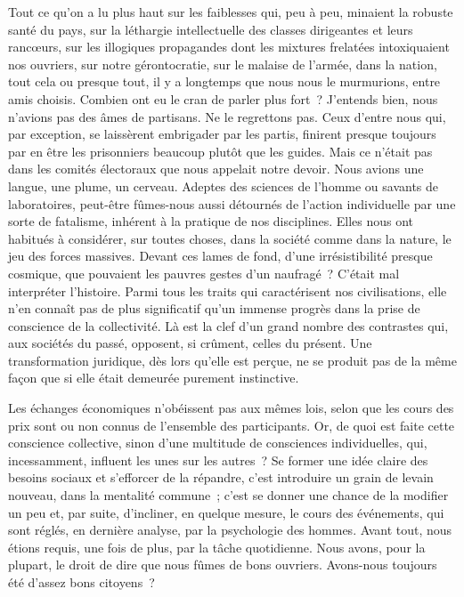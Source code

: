 \documentclass[french,twoside]{book} %
\begin{document}
Tout ce qu’on a lu plus haut sur les faiblesses qui, peu à peu, minaient la robuste santé du pays, sur la léthargie intellectuelle des classes dirigeantes et leurs rancœurs, sur les illogiques propagandes dont les mixtures frelatées intoxiquaient nos ouvriers, sur notre gérontocratie, sur le malaise de l’armée, dans la nation, tout cela ou presque tout, il y a longtemps que nous nous le murmurions, entre amis choisis. Combien ont eu le cran de parler plus fort ? J’entends bien, nous n’avions pas des âmes de partisans. Ne le regrettons pas. Ceux d’entre nous qui, par exception, se laissèrent embrigader par les partis, finirent presque toujours par en être les prisonniers beaucoup plutôt que les guides. Mais ce n’était pas dans les comités électoraux que nous appelait notre devoir. Nous avions une langue, une plume, un cerveau. Adeptes des sciences de l’homme ou savants de   laboratoires, peut-être fûmes-nous aussi détournés de l’action individuelle par une sorte de fatalisme, inhérent à la pratique de nos disciplines. Elles nous ont habitués à considérer, sur toutes choses, dans la société comme dans la nature, le jeu des forces massives. Devant ces lames de fond, d’une irrésistibilité presque cosmique, que pouvaient les pauvres gestes d’un naufragé ? C’était mal interpréter l’histoire. Parmi tous les traits qui caractérisent nos civilisations, elle n’en connaît pas de plus significatif qu’un immense progrès dans la prise de conscience de la collectivité. Là est la clef d’un grand nombre des contrastes qui, aux sociétés du passé, opposent, si crûment, celles du présent. Une transformation juridique, dès lors qu’elle est perçue, ne se produit pas de la même façon que si elle était demeurée purement instinctive.\par
Les échanges économiques n’obéissent pas aux mêmes lois, selon que les cours des prix sont ou non connus de l’ensemble des participants. Or, de quoi est faite cette conscience collective, sinon d’une multitude de consciences individuelles, qui, incessamment, influent les unes sur les autres ? Se former une idée claire des besoins sociaux et s’efforcer de la répandre, c’est introduire un grain de levain nouveau, dans la mentalité commune ; c’est se donner une chance de la modifier un peu et, par suite, d’incliner, en quelque mesure, le cours des événements, qui sont réglés, en dernière analyse, par la psychologie des hommes. Avant tout, nous étions requis, une fois de plus, par la tâche quotidienne. Nous avons, pour la plupart, le droit de dire que nous fûmes de bons ouvriers. Avons-nous toujours été d’assez bons citoyens ?\par
\end{document}
